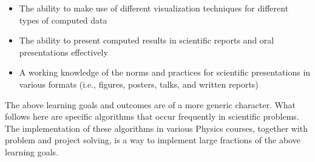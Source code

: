 \documentclass[graybox,envcountchap,sectrefs]{svmult}
\begin{document}
\begin{itemize}
\item The ability to make use of different visualization techniques for different types of computed data

\item The ability to present computed results in scientific reports and oral presentations effectively

\item A working knowledge of the norms and practices for scientific presentations in various formats (i.e., figures, posters, talks, and written reports)
\end{itemize}


The above learning goals and outcomes are of a more generic character. What follows here are specific
algorithms that occur frequently in scientific problems. The implementation of these algorithms in various Physics courses, together with problem and project solving, is a way to implement large fractions of the above learning goals. 
\end{document}
